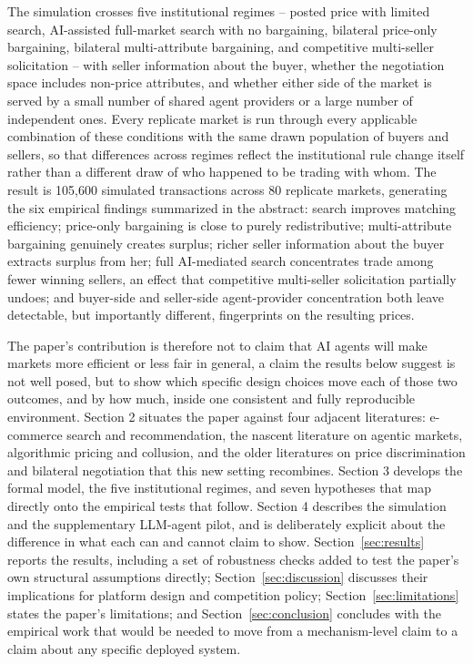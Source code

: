 \documentclass[review]{elsarticle}
\begin{document}
The simulation crosses five institutional regimes -- posted price with limited search, AI-assisted full-market search with no bargaining, bilateral price-only bargaining, bilateral multi-attribute bargaining, and competitive multi-seller solicitation -- with seller information about the buyer, whether the negotiation space includes non-price attributes, and whether either side of the market is served by a small number of shared agent providers or a large number of independent ones. Every replicate market is run through every applicable combination of these conditions with the same drawn population of buyers and sellers, so that differences across regimes reflect the institutional rule change itself rather than a different draw of who happened to be trading with whom. The result is 105,600 simulated transactions across 80 replicate markets, generating the six empirical findings summarized in the abstract: search improves matching efficiency; price-only bargaining is close to purely redistributive; multi-attribute bargaining genuinely creates surplus; richer seller information about the buyer extracts surplus from her; full AI-mediated search concentrates trade among fewer winning sellers, an effect that competitive multi-seller solicitation partially undoes; and buyer-side and seller-side agent-provider concentration both leave detectable, but importantly different, fingerprints on the resulting prices.

The paper's contribution is therefore not to claim that AI agents will make markets more efficient or less fair in general, a claim the results below suggest is not well posed, but to show which specific design choices move each of those two outcomes, and by how much, inside one consistent and fully reproducible environment. Section 2 situates the paper against four adjacent literatures: e-commerce search and recommendation, the nascent literature on agentic markets, algorithmic pricing and collusion, and the older literatures on price discrimination and bilateral negotiation that this new setting recombines. Section 3 develops the formal model, the five institutional regimes, and seven hypotheses that map directly onto the empirical tests that follow. Section 4 describes the simulation and the supplementary LLM-agent pilot, and is deliberately explicit about the difference in what each can and cannot claim to show. Section~\ref{sec:results} reports the results, including a set of robustness checks added to test the paper's own structural assumptions directly; Section~\ref{sec:discussion} discusses their implications for platform design and competition policy; Section~\ref{sec:limitations} states the paper's limitations; and Section~\ref{sec:conclusion} concludes with the empirical work that would be needed to move from a mechanism-level claim to a claim about any specific deployed system.
\end{document}
